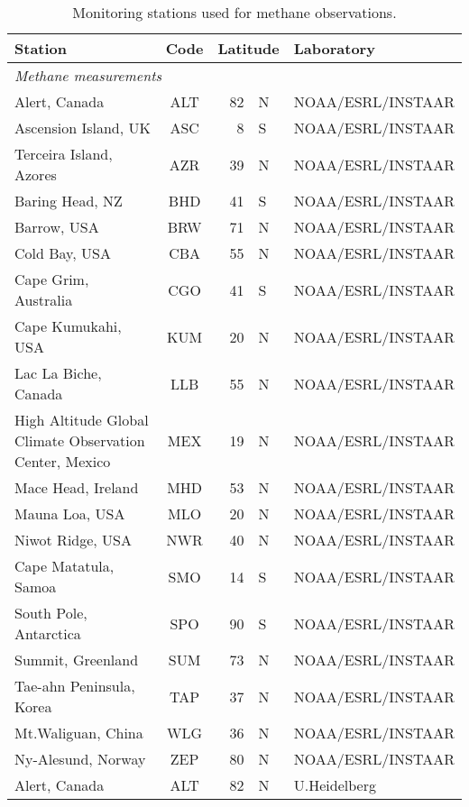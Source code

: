 \documentclass[grl]{agutexSI2019}
\begin{document}
\begin{table} [ht] 
\footnotesize %
\caption{Monitoring stations used for methane observations.\label{tbl:sites1}}
\begin{tabular}{lcr@{$^\circ$}ll}
\hline
Station						&	Code	&	\multicolumn{2}{c}{Latitude}	&	Laboratory			\\
\hline
\multicolumn{5}{l}{\hspace{-5pt}\textit{Methane measurements}}	\\
Alert, Canada				&	ALT		&	82	&	N						&	NOAA/ESRL/INSTAAR	\\
Ascension Island, UK		&	ASC		&	8	&	S						&	NOAA/ESRL/INSTAAR	\\
Terceira Island, Azores		&	AZR		&	39	&	N						&	NOAA/ESRL/INSTAAR	\\
Baring Head, NZ				&	BHD		&	41	&	S						&	NOAA/ESRL/INSTAAR	\\
Barrow, USA					&	BRW		&	71	&	N						&	NOAA/ESRL/INSTAAR	\\
Cold Bay, USA				&	CBA		&	55	&	N						&	NOAA/ESRL/INSTAAR	\\
Cape Grim, Australia		&	CGO		&	41	&	S						&	NOAA/ESRL/INSTAAR	\\
Cape Kumukahi, USA			&	KUM		&	20	&	N						&	NOAA/ESRL/INSTAAR	\\
Lac La Biche, Canada		&	LLB		&	55	&	N						&	NOAA/ESRL/INSTAAR	\\
High Altitude Global Climate Observation Center, Mexico	&MEX&19&N			&	NOAA/ESRL/INSTAAR	\\
Mace Head, Ireland			&	MHD		&	53	&	N						&	NOAA/ESRL/INSTAAR	\\
Mauna Loa, USA				&	MLO		&	20	&	N						&	NOAA/ESRL/INSTAAR	\\
Niwot Ridge, USA			&	NWR		&	40	&	N						&	NOAA/ESRL/INSTAAR	\\
Cape Matatula, Samoa		&	SMO		&	14	&	S						&	NOAA/ESRL/INSTAAR	\\
South Pole, Antarctica		&	SPO		&	90	&	S						&	NOAA/ESRL/INSTAAR	\\
Summit, Greenland			&	SUM		&	73	&	N						&	NOAA/ESRL/INSTAAR	\\
Tae-ahn Peninsula, Korea	&	TAP		&	37	&	N						&	NOAA/ESRL/INSTAAR	\\
Mt.\@ Waliguan, China		&	WLG		&	36	&	N						&	NOAA/ESRL/INSTAAR	\\
Ny-Alesund, Norway			&	ZEP		&	80	&	N						&	NOAA/ESRL/INSTAAR	\\
Alert, Canada				&	ALT		&	82	&	N						&	U.\@ Heidelberg		\\

\end{tabular}
\end{table}
\end{document}
